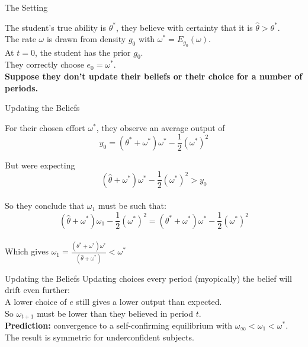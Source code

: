 \documentclass[aspectratio=169]{beamer}
\begin{document}

\begin{frame}{The Setting}

The student's true ability is $\theta^*$, they believe with certainty that it is $\hat\theta>\theta^*.$ \\
\bigskip
The rate $\omega$ is drawn from density $g_0$ with $\omega^*=E_{g_0}(\omega).$\\

\bigskip
At $t=0$, the student has the prior $g_0.$\\
\bigskip
They correctly choose $e_0 = \omega^*.$\\
\bigskip
\pause
\textbf{Suppose they don't update their beliefs or their choice for a number of periods.}
\end{frame}

\begin{frame}{Updating the Beliefs}

For their chosen effort $\omega^*$, they observe an average output of 
$$ y_0=(\theta^* + \omega^*)\omega^*-\frac{1}{2}(\omega^*)^2 $$

But were expecting
$$ (\hat\theta + \omega^*)\omega^*-\frac{1}{2}(\omega^*)^2 > y_0$$\\
\bigskip
\pause
So they conclude that $\omega_1$ must be such that:
$$(\hat \theta + \omega^*)\omega_1-\frac{1}{2}(\omega^*)^2 = (\theta^* + \omega^*)\omega^*-\frac{1}{2}(\omega^*)^2 $$\\
\bigskip 
Which gives $\omega_1 = \frac{(\theta^* + \omega^*)\omega^*}{(\hat \theta + \omega^*)}<\omega^*$
    
\end{frame}

\begin{frame}{Updating the Beliefs}
    Updating choices every period (myopically) the belief will drift even further:\\
    \bigskip
    A lower choice of $e$ still gives a lower output than expected. \\
    \bigskip
    So $\omega_{t+1}$ must be lower than they believed in period $t$.\\
    \bigskip
    \textbf{Prediction:} convergence to a self-confirming equilibrium with $\omega_\infty<\omega_1<\omega^*.$\\
    \bigskip
    The result is symmetric for underconfident subjects.
    

\end{frame}
\end{document}
\end{frame}
\end{document}
\end{frame}
\end{document}
